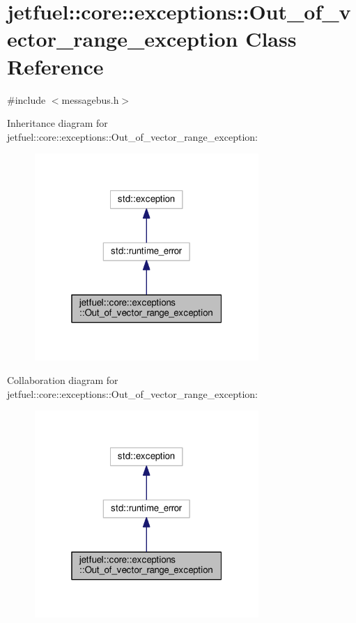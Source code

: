 \hypertarget{classjetfuel_1_1core_1_1exceptions_1_1Out__of__vector__range__exception}{}\section{jetfuel\+:\+:core\+:\+:exceptions\+:\+:Out\+\_\+of\+\_\+vector\+\_\+range\+\_\+exception Class Reference}
\label{classjetfuel_1_1core_1_1exceptions_1_1Out__of__vector__range__exception}


{\ttfamily \#include $<$messagebus.\+h$>$}



Inheritance diagram for jetfuel\+:\+:core\+:\+:exceptions\+:\+:Out\+\_\+of\+\_\+vector\+\_\+range\+\_\+exception\+:\nopagebreak
\begin{figure}[H]
\begin{center}
\leavevmode
\includegraphics[width=241pt]{classjetfuel_1_1core_1_1exceptions_1_1Out__of__vector__range__exception__inherit__graph}
\end{center}
\end{figure}


Collaboration diagram for jetfuel\+:\+:core\+:\+:exceptions\+:\+:Out\+\_\+of\+\_\+vector\+\_\+range\+\_\+exception\+:\nopagebreak
\begin{figure}[H]
\begin{center}
\leavevmode
\includegraphics[width=241pt]{classjetfuel_1_1core_1_1exceptions_1_1Out__of__vector__range__exception__coll__graph}
\end{center}
\end{figure}


